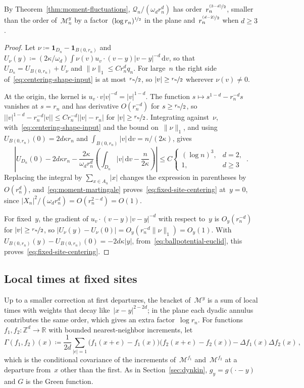 \documentclass[11pt]{amsart}
\theoremstyle{plain}
\theoremstyle{definition}
\newcommand{\Z}{\mathbb Z}
\newcommand{\R}{\mathbb R}
\newcommand{\drift}{\kappa}
\newcommand{\ind}{\mathbf 1}
\newcommand{\dd}{\,\mathrm d}
\newcommand{\nf}{\nicefrac}
\numberwithin{equation}{section}
\begin{document}
By Theorem~\ref{thm:moment-fluctuations}, $\mathcal Q_n/(\omega_dr_n^d)$ has order~$r_n^{\nf{(3-d)}{2}}$, smaller than the order of~$\mathcal M^y_n$ by a factor~$(\log r_n)^{\nf12}$ in the plane and~$r_n^{\nf{(d-2)}{2}}$ when $d\geq3$.

\begin{proof}
Let $\nu\coloneqq\ind_{D_n}-\ind_{B(0,r_n)}$ and $U_\nu(y)\coloneqq(2\drift/\omega_d)\int\nu(v)u_v\cdot(v-y)|v-y|^{-d}\dd v$, so that $U_{D_n}=U_{B(0,r_n)}+U_\nu$ and $\|\nu\|_1\leq Cr_n^dq_n$. For large~$n$ the right side of~\eqref{eq:centering-shape-input} is at most~$\nf{r_n}{2}$, so $|v|\geq\nf{r_n}{2}$ wherever $\nu(v)\neq0$.

At the origin, the kernel is $u_v\cdot v|v|^{-d}=|v|^{1-d}$. The function $s\mapsto s^{1-d}-r_n^{-d}s$ vanishes at $s=r_n$ and has derivative $O(r_n^{-d})$ for $s\geq\nf{r_n}{2}$, so $\bigl||v|^{1-d}-r_n^{-d}|v|\bigr|\leq Cr_n^{-d}\bigl||v|-r_n\bigr|$ for $|v|\geq\nf{r_n}{2}$. Integrating against~$\nu$, with~\eqref{eq:centering-shape-input} and the bound on~$\|\nu\|_1$, and using $U_{B(0,r_n)}(0)=2d\drift r_n$ and $\int_{B(0,r_n)}|v|\dd v=n/(2\drift)$, gives
\begin{equation*}
\left|U_{D_n}(0)-2d\drift r_n-\frac{2\drift}{\omega_dr_n^d}\left(\int_{D_n}|v|\dd v-\frac{n}{2\drift}\right)\right|\leq C\begin{cases}(\log n)^3,&d=2,\\1,&d\geq3\end{cases}\, .
\end{equation*}
Replacing the integral by $\sum_{x\in A_n}|x|$ changes the expression in parentheses by $O(r_n^d)$, and~\eqref{eq:moment-martingale} proves~\eqref{eq:fixed-site-centering} at~$y=0$, since $|X_n|^2/(\omega_dr_n^d)=O(r_n^{2-d})=O(1)$.

For fixed~$y$, the gradient of $u_v\cdot(v-y)|v-y|^{-d}$ with respect to~$y$ is $O_y(r_n^{-d})$ for $|v|\geq\nf{r_n}{2}$, so $|U_\nu(y)-U_\nu(0)|=O_y(r_n^{-d}\|\nu\|_1)=O_y(1)$. With $U_{B(0,r_n)}(y)-U_{B(0,r_n)}(0)=-2d\drift|y|$, from~\eqref{eq:ballpotential-euclid}, this proves~\eqref{eq:fixed-site-centering}.
\end{proof}

\subsection{Local times at fixed sites}

Up to a smaller correction at first departures, the bracket of~$\mathcal M^y$ is a sum of local times with weights that decay like~$|x-y|^{2-2d}$; in the plane each dyadic annulus contributes the same order, which gives an extra factor~$\log r_n$. For functions $f_1,f_2\colon\Z^d\to\R$ with bounded nearest-neighbor increments, let
\begin{equation}\label{eq:site-gamma}
\Gamma(f_1,f_2)(x)\coloneqq\frac1{2d}\sum_{|e|=1}\bigl(f_1(x+e)-f_1(x)\bigr)\bigl(f_2(x+e)-f_2(x)\bigr)-\Delta f_1(x)\Delta f_2(x)\, ,
\end{equation}
which is the conditional covariance of the increments of~$\mathcal M^{f_1}$ and~$\mathcal M^{f_2}$ at a departure from~$x$ other than the first. As in Section~\ref{sec:dynkin}, $g_y=g(\cdot-y)$ and $G$ is the Green function.
\end{document}
